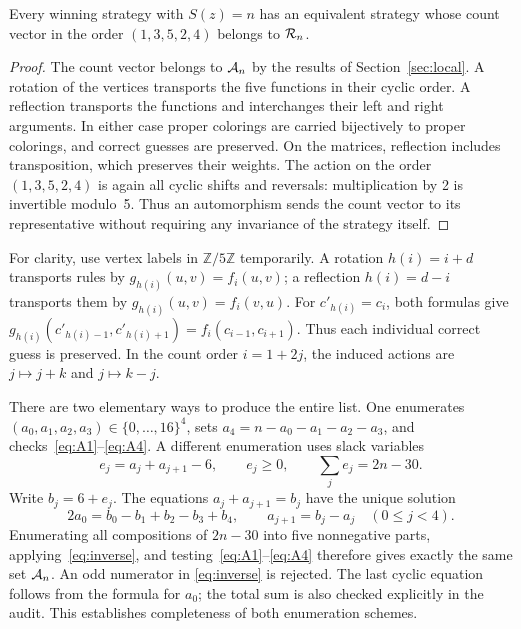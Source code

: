 \begin{lemma}\label{lem:dihedral}
Every winning strategy with $S(z)=n$ has an equivalent strategy whose
count vector in the order $(1,3,5,2,4)$ belongs to $\mathcal{R}_n$.
\end{lemma}
\begin{proof}
The count vector belongs to $\mathcal{A}_n$ by the results of
Section~\ref{sec:local}. A rotation of the vertices transports the five
functions in their cyclic order. A reflection transports the functions
and interchanges their left and right arguments. In either case proper
colorings are carried bijectively to proper colorings, and correct guesses
are preserved. On the matrices, reflection includes transposition, which
preserves their weights. The action on the order $(1,3,5,2,4)$ is again all
cyclic shifts and reversals: multiplication by 2 is invertible modulo~5.
Thus an automorphism sends the count vector to its representative without
requiring any invariance of the strategy itself.
\end{proof}

For clarity,
use vertex labels in $\mathbb Z/5\mathbb Z$ temporarily. A rotation
$h(i)=i+d$ transports rules by $g_{h(i)}(u,v)=f_i(u,v)$; a reflection
$h(i)=d-i$ transports them by $g_{h(i)}(u,v)=f_i(v,u)$. For
$c'_{h(i)}=c_i$, both formulas give
$g_{h(i)}(c'_{h(i)-1},c'_{h(i)+1})=f_i(c_{i-1},c_{i+1})$.
Thus each individual correct guess is preserved. In the count order
$i=1+2j$, the induced actions are $j\mapsto j+k$ and $j\mapsto k-j$.

There are two elementary ways to produce the entire list. One enumerates
$(a_0,a_1,a_2,a_3)\in\{0,\ldots,16\}^4$, sets
$a_4=n-a_0-a_1-a_2-a_3$, and checks~\eqref{eq:A1}--\eqref{eq:A4}. A
different enumeration uses slack variables
\begin{equation}\label{eq:slack}
e_j=a_j+a_{j+1}-6,\qquad e_j\geq0,\qquad\sum_je_j=2n-30.
\end{equation}
Write $b_j=6+e_j$. The equations $a_j+a_{j+1}=b_j$ have the unique solution
\begin{equation}\label{eq:inverse}
2a_0=b_0-b_1+b_2-b_3+b_4,\qquad
a_{j+1}=b_j-a_j\quad(0\leq j<4).
\end{equation}
Enumerating all compositions of $2n-30$ into five nonnegative parts,
applying~\eqref{eq:inverse}, and testing~\eqref{eq:A1}--\eqref{eq:A4}
therefore gives exactly the same set $\mathcal{A}_n$. An odd numerator in
\eqref{eq:inverse} is rejected. The last cyclic equation follows from the
formula for $a_0$; the total sum is also checked explicitly in the audit.
This establishes completeness of both enumeration schemes.

